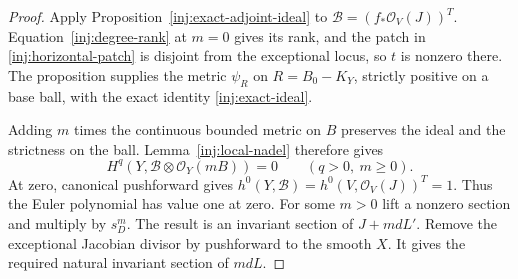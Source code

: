 \begin{proof}
Apply Proposition~\ref{inj:exact-adjoint-ideal} to
$\mathcal B=(f_*\mathcal O_V(J))^T$. Equation~\eqref{inj:degree-rank}
at $m=0$ gives its rank, and the patch in
\eqref{inj:horizontal-patch} is disjoint from the exceptional locus,
so $t$ is nonzero there. The proposition supplies the metric
$\psi_R$ on $R=B_0-K_Y$, strictly positive on a base ball, with the
exact identity \eqref{inj:exact-ideal}.

Adding $m$ times the continuous bounded metric on $B$ preserves the
ideal and the strictness on the ball.  Lemma~\ref{inj:local-nadel}
therefore gives
\[
 H^q(Y,\mathcal B\otimes\mathcal O_Y(mB))=0
 \qquad(q>0,\ m\ge0).
\]
At zero, canonical pushforward gives
$h^0(Y,\mathcal B)=h^0(V,\mathcal O_V(J))^T=1$.
Thus the Euler polynomial has value one at zero.  For some $m>0$ lift a nonzero section
and multiply by $s_D^m$.  The result is an invariant section of
$J+mdL'$.  Remove the exceptional Jacobian divisor by pushforward
to the smooth $X$.  It gives the required natural invariant section
of $mdL$.
\end{proof}
